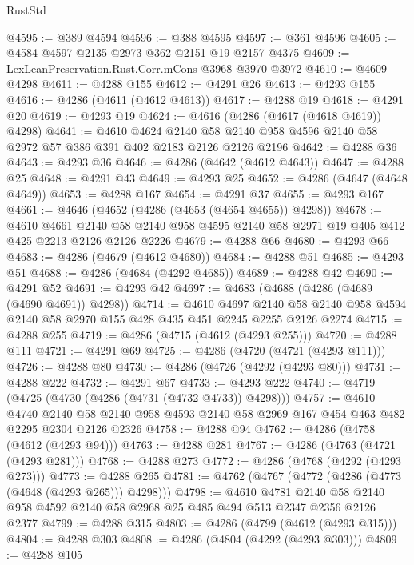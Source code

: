 \begin{lexlean}{RustStd}
\begin{coremodule}
{\begin{coremodule}
{{{{{{{{{{{{{{{{@4595 := @389 @4594
@4596 := @388 @4595
@4597 := @361 @4596
@4605 := @4584 @4597 @2135 @2973 @362 @2151 @19 @2157 @4375
@4609 := LexLeanPreservation.Rust.Corr.mCons @3968 @3970 @3972
@4610 := @4609 @4298
@4611 := @4288 @155
@4612 := @4291 @26
@4613 := @4293 @155
@4616 := @4286 (@4611 (@4612 @4613))
@4617 := @4288 @19
@4618 := @4291 @20
@4619 := @4293 @19
@4624 := @4616 (@4286 (@4617 (@4618 @4619)) @4298)
@4641 := @4610
    @4624
    @2140
    @58
    @2140
    @958
    @4596
    @2140
    @58
    @2972
    @57
    @386
    @391
    @402
    @2183
    @2126
    @2126
    @2196
@4642 := @4288 @36
@4643 := @4293 @36
@4646 := @4286 (@4642 (@4612 @4643))
@4647 := @4288 @25
@4648 := @4291 @43
@4649 := @4293 @25
@4652 := @4286 (@4647 (@4648 @4649))
@4653 := @4288 @167
@4654 := @4291 @37
@4655 := @4293 @167
@4661 := @4646 (@4652 (@4286 (@4653 (@4654 @4655)) @4298))
@4678 := @4610
    @4661
    @2140
    @58
    @2140
    @958
    @4595
    @2140
    @58
    @2971
    @19
    @405
    @412
    @425
    @2213
    @2126
    @2126
    @2226
@4679 := @4288 @66
@4680 := @4293 @66
@4683 := @4286 (@4679 (@4612 @4680))
@4684 := @4288 @51
@4685 := @4293 @51
@4688 := @4286 (@4684 (@4292 @4685))
@4689 := @4288 @42
@4690 := @4291 @52
@4691 := @4293 @42
@4697 := @4683 (@4688 (@4286 (@4689 (@4690 @4691)) @4298))
@4714 := @4610
    @4697
    @2140
    @58
    @2140
    @958
    @4594
    @2140
    @58
    @2970
    @155
    @428
    @435
    @451
    @2245
    @2255
    @2126
    @2274
@4715 := @4288 @255
@4719 := @4286 (@4715 (@4612 (@4293 @255)))
@4720 := @4288 @111
@4721 := @4291 @69
@4725 := @4286 (@4720 (@4721 (@4293 @111)))
@4726 := @4288 @80
@4730 := @4286 (@4726 (@4292 (@4293 @80)))
@4731 := @4288 @222
@4732 := @4291 @67
@4733 := @4293 @222
@4740 := @4719 (@4725 (@4730 (@4286 (@4731 (@4732 @4733)) @4298)))
@4757 := @4610
    @4740
    @2140
    @58
    @2140
    @958
    @4593
    @2140
    @58
    @2969
    @167
    @454
    @463
    @482
    @2295
    @2304
    @2126
    @2326
@4758 := @4288 @94
@4762 := @4286 (@4758 (@4612 (@4293 @94)))
@4763 := @4288 @281
@4767 := @4286 (@4763 (@4721 (@4293 @281)))
@4768 := @4288 @273
@4772 := @4286 (@4768 (@4292 (@4293 @273)))
@4773 := @4288 @265
@4781 := @4762 (@4767 (@4772 (@4286 (@4773 (@4648 (@4293 @265))) @4298)))
@4798 := @4610
    @4781
    @2140
    @58
    @2140
    @958
    @4592
    @2140
    @58
    @2968
    @25
    @485
    @494
    @513
    @2347
    @2356
    @2126
    @2377
@4799 := @4288 @315
@4803 := @4286 (@4799 (@4612 (@4293 @315)))
@4804 := @4288 @303
@4808 := @4286 (@4804 (@4292 (@4293 @303)))
@4809 := @4288 @105
}}}}}}}}}}}}}}}}
\end{coremodule}}
\end{coremodule}
\end{lexlean}
